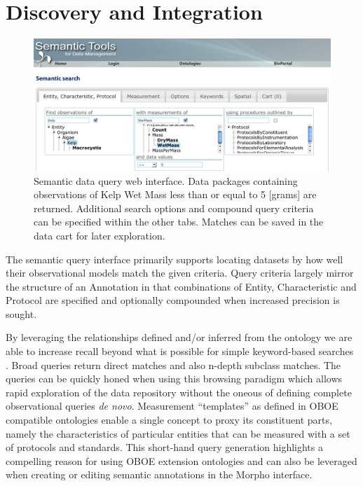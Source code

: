 
\section{Discovery and Integration}
\label{sec:application}

\begin{figure}[!t]
\centering
\includegraphics[width=1.0\textwidth]{images/metacat-query.png}
\caption{Semantic data query web interface. Data packages containing observations of Kelp Wet Mass less than or equal to 5 [grams] are returned. Additional search options and compound query criteria can be specified within the other tabs. Matches can be saved in the data cart for later exploration.}
\label{fig:metacat-query}
\end{figure}

 The semantic query interface primarily supports locating datasets by how well their observational models match the given criteria. Query criteria largely mirror the structure of an Annotation in that combinations of Entity, Characteristic and Protocol are specified and optionally compounded when increased precision is sought. 

By leveraging the relationships defined and/or inferred from the
ontology we are able to increase recall beyond what is possible for
simple keyword-based searches
\cite{berkley09:_improv_data_discov_for_metad}. Broad queries return
direct matches and also n-depth subclass matches. The queries can be
quickly honed when using this browsing paradigm which allows rapid
exploration of the data repository without the oneous of defining
complete observational queries \emph{de novo}. Measurement ``templates''
as defined in OBOE compatible ontologies enable a single concept to
proxy its constituent parts, namely the characteristics of
particular entities that can be measured with a set of protocols and
standards. This short-hand query generation highlights a
compelling reason for using OBOE extension ontologies and can
also be leveraged when creating or editing semantic annotations in the Morpho interface.  

